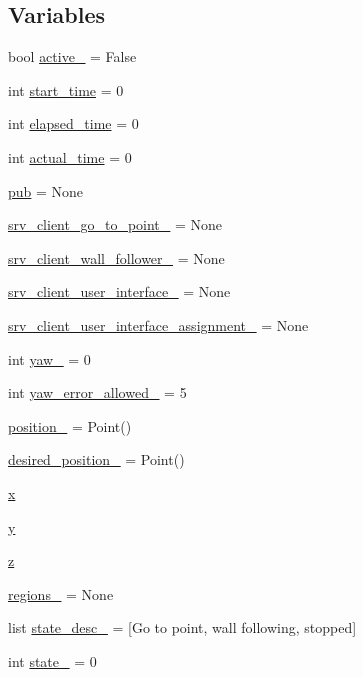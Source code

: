 \subsection*{Variables}
\begin{DoxyCompactItemize}
\item 
bool \hyperlink{namespacebug__algo_a3bec537d2bfc115b0a14ee6bad41bd00}{active\+\_\+} = False
\item 
int \hyperlink{namespacebug__algo_a6ff626c7bf6a4dfec4e8508d8ae5097c}{start\+\_\+time} = 0
\item 
int \hyperlink{namespacebug__algo_af723ba0d909555b34934483c74e06818}{elapsed\+\_\+time} = 0
\item 
int \hyperlink{namespacebug__algo_af9e77fe7842316d1491ef585c7602710}{actual\+\_\+time} = 0
\item 
\hyperlink{namespacebug__algo_a17a7504f2f0f6714f6ac31a43107fc31}{pub} = None
\item 
\hyperlink{namespacebug__algo_a52e8d210b667d955534f12f59f191eb3}{srv\+\_\+client\+\_\+go\+\_\+to\+\_\+point\+\_\+} = None
\item 
\hyperlink{namespacebug__algo_afe0f6c6a1a9bc751e4bbcae499815585}{srv\+\_\+client\+\_\+wall\+\_\+follower\+\_\+} = None
\item 
\hyperlink{namespacebug__algo_a1a55011236874d9af4afcf4c3524bbf0}{srv\+\_\+client\+\_\+user\+\_\+interface\+\_\+} = None
\item 
\hyperlink{namespacebug__algo_ac9de3b470960260c4510748850446480}{srv\+\_\+client\+\_\+user\+\_\+interface\+\_\+assignment\+\_\+} = None
\item 
int \hyperlink{namespacebug__algo_a2c8d86dd369e86415dc7ff9c617033d7}{yaw\+\_\+} = 0
\item 
int \hyperlink{namespacebug__algo_a3714c955ff3cf688c84d6dc5654833d6}{yaw\+\_\+error\+\_\+allowed\+\_\+} = 5
\item 
\hyperlink{namespacebug__algo_ac0035ad008802f966f437b4787365220}{position\+\_\+} = Point()
\item 
\hyperlink{namespacebug__algo_a6bc76d9dd5213819c8287c8833f8f3bd}{desired\+\_\+position\+\_\+} = Point()
\item 
\hyperlink{namespacebug__algo_ae006850add8691db5d752b4ccb732ac1}{x}
\item 
\hyperlink{namespacebug__algo_a1e2d049a4b898c92454f0fb146a413ee}{y}
\item 
\hyperlink{namespacebug__algo_ad9944dcf5037184fbfbe3162935d2a57}{z}
\item 
\hyperlink{namespacebug__algo_a31fd6300649f8a600eb87ebed00b174f}{regions\+\_\+} = None
\item 
list \hyperlink{namespacebug__algo_a419cb7998b9a3946692fc01f5d73a25b}{state\+\_\+desc\+\_\+} = \mbox{[}\textquotesingle{}Go to point\textquotesingle{}, \textquotesingle{}wall following\textquotesingle{}, \textquotesingle{}stopped\textquotesingle{}\mbox{]}
\item 
int \hyperlink{namespacebug__algo_a5bf52a66b7821a097f6e653a2422748e}{state\+\_\+} = 0
\end{DoxyCompactItemize}


